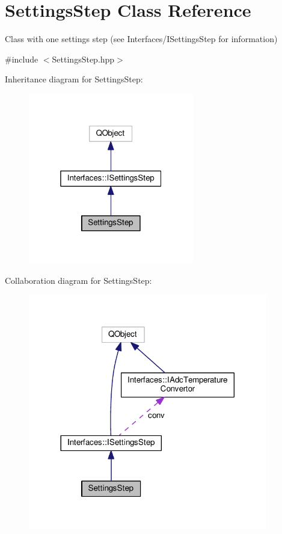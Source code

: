 \hypertarget{class_settings_step}{}\section{Settings\+Step Class Reference}
\label{class_settings_step}


Class with one settings step (see Interfaces/\+I\+Settings\+Step for information)  




{\ttfamily \#include $<$Settings\+Step.\+hpp$>$}



Inheritance diagram for Settings\+Step\+:\nopagebreak
\begin{figure}[H]
\begin{center}
\leavevmode
\includegraphics[width=205pt]{class_settings_step__inherit__graph}
\end{center}
\end{figure}


Collaboration diagram for Settings\+Step\+:\nopagebreak
\begin{figure}[H]
\begin{center}
\leavevmode
\includegraphics[width=296pt]{class_settings_step__coll__graph}
\end{center}
\end{figure}
